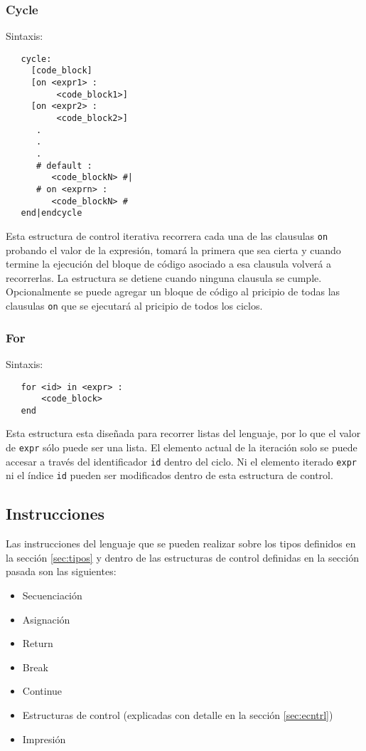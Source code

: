 \documentclass[12pt, spanish]{report}
\begin{document}
\subsubsection{Cycle}
Sintaxis:
\begin{verbatim}
   cycle:
     [code_block]
     [on <expr1> :
          <code_block1>]
     [on <expr2> :
          <code_block2>]
      .
      .
      .
      # default :
         <code_blockN> #|
      # on <exprn> : 
         <code_blockN> #
   end|endcycle
\end{verbatim}
Esta estructura de control iterativa recorrera cada una de las clausulas
\texttt{on} probando el valor de la expresi\'on, tomar\'a la primera que sea cierta
y cuando termine la ejecuci\'on del bloque de c\'odigo asociado a esa
clausula volver\'a a recorrerlas. La estructura se detiene cuando ninguna
clausula se cumple. Opcionalmente se puede agregar un bloque de c\'odigo
al pricipio de todas las clausulas \texttt{on} que se ejecutar\'a al
pricipio de todos los ciclos.


\subsubsection{For}
Sintaxis:
\begin{verbatim}
   for <id> in <expr> :
       <code_block>
   end
\end{verbatim}

Esta estructura esta dise\~nada para recorrer listas del lenguaje, 
por lo que el valor de \texttt{expr} s\'olo puede ser una lista. 
El elemento actual de la iteraci\'on solo se puede accesar a trav\'es 
del identificador \texttt{id} dentro del ciclo. Ni el elemento iterado 
\texttt{expr} ni el \'indice \texttt{id} pueden ser modificados dentro
de esta estructura de control.\\


\subsection{Instrucciones}
\label{sec:instr}

Las instrucciones del lenguaje que se pueden realizar sobre los tipos
definidos en la secci\'on \ref{sec:tipos} y dentro de las estructuras de
control definidas en la secci\'on pasada son las siguientes:

\begin{itemize}
\item Secuenciaci\'on
\item Asignaci\'on
\item Return
\item Break
\item Continue
\item Estructuras de control (explicadas con detalle en la secci\'on \ref{sec:ecntrl})
\item Impresi\'on
\end{itemize}
\end{document}
